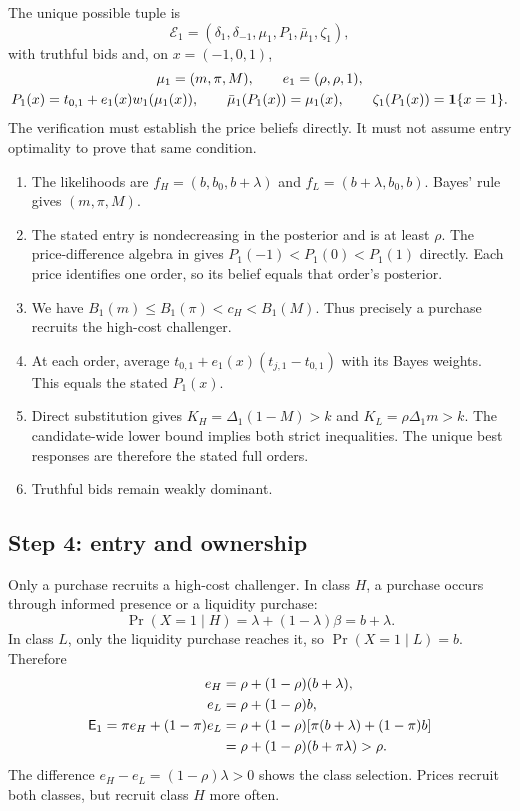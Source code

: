 The unique possible tuple is
\[
\mathcal E_1=(\delta_1,\delta_{-1},\mu_1,P_1,\bar\mu_1,\zeta_1),
\]
with truthful bids and, on $x=(-1,0,1)$,
\begin{gather*}
\mu_1=(m,\pi,M),\qquad e_1=(\rho,\rho,1),\\
P_1(x)=t_{0,1}+e_1(x)w_1(\mu_1(x)),\qquad
\bar\mu_1(P_1(x))=\mu_1(x),\qquad \zeta_1(P_1(x))=\mathbf{1}\{x=1\}.
\end{gather*}
The verification must establish the price beliefs directly.
It must not assume entry optimality to prove that same condition.
\begin{enumerate}[label=(E\arabic*),leftmargin=3em]
\item The likelihoods are $f_H=(b,b_0,b+\lambda)$ and $f_L=(b+\lambda,b_0,b)$.
Bayes' rule gives $(m,\pi,M)$.
\item The stated entry is nondecreasing in the posterior and is at least $\rho$.
The price-difference algebra in  gives $P_1(-1)<P_1(0)<P_1(1)$ directly.
Each price identifies one order, so its belief equals that order's posterior.
\item We have $B_1(m)\le B_1(\pi)<c_H<B_1(M)$.
Thus precisely a purchase recruits the high-cost challenger.
\item At each order, average $t_{0,1}+e_1(x)(t_{j,1}-t_{0,1})$ with its Bayes weights.
This equals the stated $P_1(x)$.
\item Direct substitution gives $K_H=\Delta_1(1-M)>k$ and $K_L=\rho\Delta_1m>k$.
The candidate-wide lower bound implies both strict inequalities.
The unique best responses are therefore the stated full orders.
\item Truthful bids remain weakly dominant.
\end{enumerate}

\subsection{Step 4: entry and ownership}
\label{sec:06_main_result-entry}

Only a purchase recruits a high-cost challenger.
In class $H$, a purchase occurs through informed presence or a liquidity purchase:
\[
\Pr(X=1\mid H)=\lambda+(1-\lambda)\beta=b+\lambda.
\]
In class $L$, only the liquidity purchase reaches it, so $\Pr(X=1\mid L)=b$.
Therefore
\begin{align*}
e_H&=\rho+(1-\rho)(b+\lambda),\\
e_L&=\rho+(1-\rho)b,\\
\mathsf{E}_1=\pi e_H+(1-\pi)e_L
&=\rho+(1-\rho)[\pi(b+\lambda)+(1-\pi)b]\\
&=\rho+(1-\rho)(b+\pi\lambda)>\rho.
\end{align*}
The difference $e_H-e_L=(1-\rho)\lambda>0$ shows the class selection.
Prices recruit both classes, but recruit class $H$ more often.

